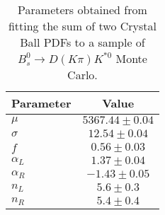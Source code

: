 \begin{table}[h]
  \centering
  \begin{tabular}{lc}
      \toprule
      Parameter & Value \\
      \midrule
      $\mu$ & $5367.44 \pm 0.04$ \\
      $\sigma$ & $12.54 \pm 0.04$ \\
      $f$ & $0.56 \pm 0.03$ \\
      $\alpha_L$ & $1.37 \pm 0.04$ \\
      $\alpha_R$ & $-1.43 \pm 0.05$ \\
      $n_L$ & $5.6 \pm 0.3$ \\
      $n_R$ & $5.4 \pm 0.4$ \\
  \bottomrule
  \end{tabular}
  \caption{Parameters obtained from fitting the sum of two Crystal Ball PDFs to a sample of $B^0_s \to D(K\pi)K^{*0}$ Monte Carlo.}
\label{tab:signal_Bs_MC_params}
\end{table}
